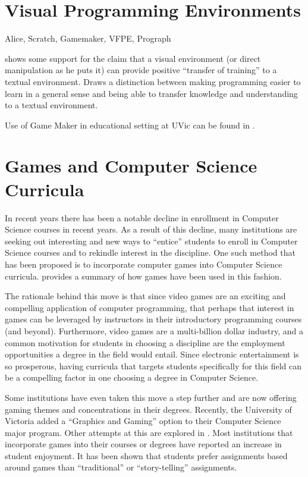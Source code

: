 \section{Visual Programming Environments}

Alice, Scratch, Gamemaker, VFPE, Prograph

\cite{Hundhausen09} shows some support for the claim that a visual environment (or direct manipulation as he puts it) can provide positive ``transfer of training'' to a textual environment.  Draws a distinction between making programming easier to learn in a general sense and being able to transfer knowledge and understanding to a textual environment.

Use of Game Maker in educational setting at UVic can be found in \cite{Gooch08}.


\section{Games and Computer Science Curricula}
\label{chapter:problemSec:games}

In recent years there has been a notable decline in enrollment in Computer Science courses in recent years\cite{Manaris07,Vesgo07,Ward08,Bayliss09}.  As a result of this decline, many institutions are seeking out interesting and new ways to ``entice'' students to enroll in Computer Science courses and to rekindle interest in the discipline.  One such method that has been proposed is to incorporate computer games into Computer Science curricula.  \cite{Cliburn06} provides a summary of how games have been used in this fashion.

The rationale behind this move is that since video games are an exciting and compelling application of computer programming, that perhaps that interest in games can be leveraged by instructors in their introductory programming courses (and beyond)\cite{Overmars04,Sweedyk05,Barnes08}.  Furthermore, video games are a multi-billion dollar industry\cite{Wallace06}, and a common motivation for students in choosing a discipline are the employment opportunities a degree in the field would entail.  Since electronic entertainment is so prosperous, having curricula that targets students specifically for this field can be a compelling factor in one choosing a degree in Computer Science.

Some institutions have even taken this move a step further and are now offering gaming themes and concentrations in their degrees.  Recently, the University of Victoria added a ``Graphics and Gaming'' option to their Computer Science major program.  Other attempts at this are explored in \cite{Leutenegger07,Murray06,Zyda06}.  Most institutions that incorporate games into their courses or degrees have reported an increase in student enjoyment.  It has been shown that students prefer assignments based around games than ``traditional'' or ``story-telling'' assignments\cite{Cliburn08}.

